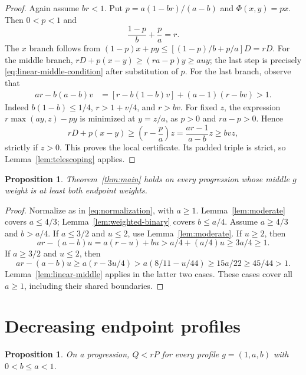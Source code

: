 \documentclass[11pt,a4paper]{article}
\newtheorem{proposition}[theorem]{Proposition}
\theoremstyle{remark}
\begin{document}
\begin{proof}
Again assume $br<1$. Put $p=a(1-br)/(a-b)$ and $\Phi(x,y)=px$.
Then $0<p<1$ and
\[
 \frac{1-p}{b}+\frac pa=r.
\]
The $x$ branch follows from
$(1-p)x+py\le[(1-p)/b+p/a]D=rD$.
For the middle branch,
$rD+p(x-y)\ge(ra-p)y\ge auy$; the last step is precisely
\eqref{eq:linear-middle-condition} after substitution of $p$.
For the last branch, observe that
\begin{align*}
 ar-b(a-b)v
 &=[r-b(1-b)v]+(a-1)(r-bv)>1.
\end{align*}
Indeed $b(1-b)\le1/4$, $r>1+v/4$, and $r>bv$.
For fixed $z$, the expression $r\max(ay,z)-py$ is minimized at $y=z/a$,
as $p>0$ and $ra-p>0$. Hence
\[
 rD+p(x-y)\ge\left(r-\frac pa\right)z
 =\frac{ar-1}{a-b}z\ge bvz,
\]
strictly if $z>0$. This proves the local certificate.
Its padded triple is strict, so Lemma~\ref{lem:telescoping} applies.
\end{proof}

\begin{proposition}\label{prop:middle}
Theorem~\ref{thm:main} holds on every progression whose middle $g$
weight is at least both endpoint weights.
\end{proposition}

\begin{proof}
Normalize as in \eqref{eq:normalization}, with $a\ge1$.
Lemma~\ref{lem:moderate} covers $a\le4/3$;
Lemma~\ref{lem:weighted-binary} covers $b\le a/4$.
Assume $a\ge4/3$ and $b>a/4$.
If $a\le3/2$ and $u\le2$, use Lemma~\ref{lem:moderate}.
If $u\ge2$, then
\[
 ar-(a-b)u=a(r-u)+bu>a/4+(a/4)u\ge3a/4\ge1.
\]
If $a\ge3/2$ and $u\le2$, then
\[
 ar-(a-b)u\ge a(r-3u/4)
 >a(8/11-u/44)\ge15a/22\ge45/44>1.
\]
Lemma~\ref{lem:linear-middle} applies in the latter two cases.
These cases cover all $a\ge1$, including their shared boundaries.
\end{proof}

\section{Decreasing endpoint profiles}\label{sec:monotone}

\begin{proposition}\label{prop:monotone}
On a progression, $Q<rP$ for every profile
$g=(1,a,b)$ with $0<b\le a<1$.
\end{proposition}
\end{document}
